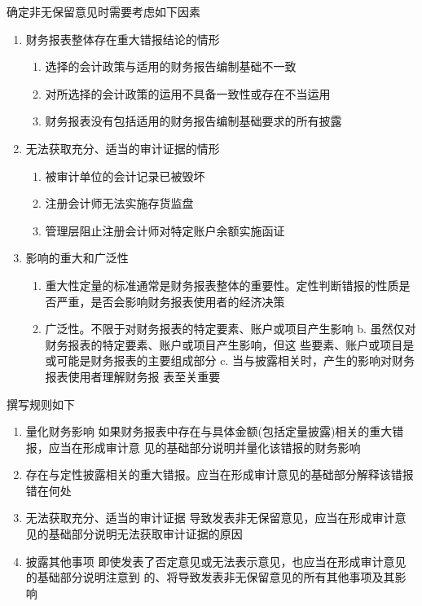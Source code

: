 \documentclass[UTF8,12pt]{ctexart}
\numberwithin{equation}{section} %
\numberwithin{figure}{section}
\numberwithin{table}{section}
\begin{document}
	确定非无保留意见时需要考虑如下因素
	\begin{enumerate}
		\item 财务报表整体存在重大错报结论的情形 
		\begin{enumerate}
			\item 选择的会计政策与适用的财务报告编制基础不一致 
			
			\item 对所选择的会计政策的运用不具备一致性或存在不当运用 
			
			\item 财务报表没有包括适用的财务报告编制基础要求的所有披露
		\end{enumerate}
		
		\item 无法获取充分、适当的审计证据的情形 
		\begin{enumerate}
			\item 被审计单位的会计记录已被毁坏 
			
			\item 注册会计师无法实施存货监盘 
			
			\item 管理层阻止注册会计师对特定账户余额实施函证
		\end{enumerate}
		
		\item 影响的重大和广泛性
		\begin{enumerate}
			\item 重大性定量的标准通常是财务报表整体的重要性。定性判断错报的性质是否严重，是否会影响财务报表使用者的经济决策
			
			\item 广泛性。不限于对财务报表的特定要素、账户或项目产生影响 b.  虽然仅对财务报表的特定要素、账户或项目产生影响，但这
			些要素、账户或项目是或可能是财务报表的主要组成部分 c.  当与披露相关时，产生的影响对财务报表使用者理解财务报
			表至关重要
		\end{enumerate}
	\end{enumerate}
	
	撰写规则如下
	\begin{enumerate}
		\item 量化财务影响 如果财务报表中存在与具体金额(包括定量披露)相关的重大错报，应当在形成审计意 见的基础部分说明并量化该错报的财务影响
		
		\item 存在与定性披露相关的重大错报。应当在形成审计意见的基础部分解释该错报错在何处
		
		\item 无法获取充分、适当的审计证据 导致发表非无保留意见，应当在形成审计意见的基础部分说明无法获取审计证据的原因
		
		\item 披露其他事项 即使发表了否定意见或无法表示意见，也应当在形成审计意见的基础部分说明注意到 的、将导致发表非无保留意见的所有其他事项及其影响
	\end{enumerate}
	
\end{document}
